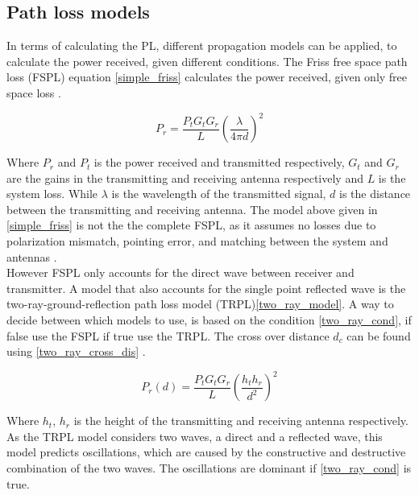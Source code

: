 \subsection{Path loss models}

In terms of calculating the PL, different propagation models can be applied, to calculate the power received, given different conditions. The Friss free space path loss (FSPL) equation  \eqref{simple_friss} calculates the power received, given only free space loss \cite{Chong}.

\begin{equation}
P_r = \frac{P_t G_t G_r}{L} \left(\frac{\lambda}{4 \pi d}\right)^2
\label{simple_friss}
\end{equation}

Where $P_{r}$ and $P_{t}$ is the power received and transmitted respectively, $G_t$ and $G_r$ are the gains in the transmitting and receiving antenna respectively and $L$ is the system loss. While $\lambda$ is the wavelength of the transmitted signal, $d$ is the distance between the transmitting and receiving antenna. The model above given in \eqref{simple_friss} is not the the complete FSPL, as it assumes no losses due to polarization mismatch, pointing error, and matching between the system and antennas \cite{full_friss}. \\

However FSPL only accounts for the direct wave between receiver and transmitter. A model that also accounts for the single point reflected wave is the two-ray-ground-reflection path loss model (TRPL)\eqref{two_ray_model}. A way to decide between which models to use, is based on the condition \eqref{two_ray_cond}, if false use the FSPL if true use the TRPL. The cross over distance $d_c$ can be found using \eqref{two_ray_cross_dis} \cite{two_ray}. 


\begin{equation}
P_r(d) = \frac{P_t G_t G_r }{L}\left(\frac{h_t h_r}{d^2}\right)^2
\label{two_ray_model}
\end{equation}

Where $h_t$, $h_r$ is the height of the transmitting and receiving antenna respectively. \\
As the TRPL model considers two waves, a direct and a reflected wave, this model predicts oscillations, which are caused by the constructive and destructive combination of the two waves. The oscillations are dominant if \eqref{two_ray_cond} is true\cite{two_ray}.


